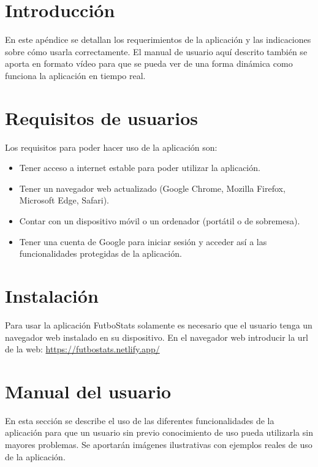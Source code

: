 
\section{Introducción}
En este apéndice se detallan los requerimientos de la aplicación y las indicaciones sobre cómo usarla correctamente. El manual de usuario aquí descrito también se aporta en formato vídeo para que se pueda ver de una forma dinámica como funciona la aplicación en tiempo real.

\section{Requisitos de usuarios}
Los requisitos para poder hacer uso de la aplicación son:
\begin{itemize}
    \item Tener acceso a internet estable para poder utilizar la aplicación.
    \item Tener un navegador web actualizado (Google Chrome, Mozilla Firefox, Microsoft Edge, Safari).
    \item Contar con un dispositivo móvil o un ordenador (portátil o de sobremesa). 
    \item Tener una cuenta de Google para iniciar sesión y acceder así a las funcionalidades protegidas de la aplicación.
\end{itemize}

\section{Instalación}
Para usar la aplicación FutboStats solamente es necesario que el usuario tenga un navegador web instalado en su dispositivo.
En el navegador web introducir la url de la web: \href{https://futbostats.netlify.app/}{https://futbostats.netlify.app/} 

\section{Manual del usuario}
En esta sección se describe el uso de las diferentes funcionalidades de la aplicación para que un usuario sin previo conocimiento de uso pueda utilizarla sin mayores problemas. Se aportarán imágenes ilustrativas con ejemplos reales de uso de la aplicación.

